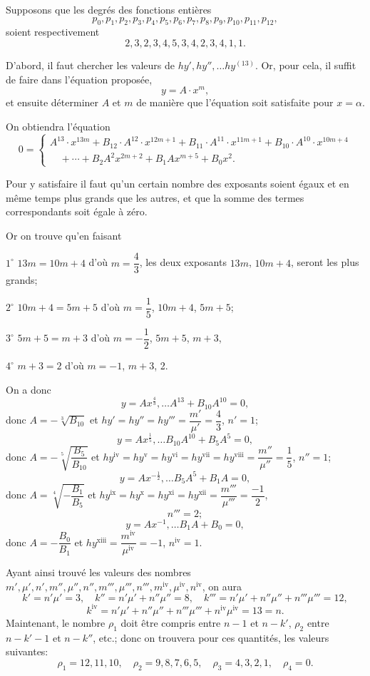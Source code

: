 \documentclass{article}
\begin{document}
Supposons que les degrés des fonctions entières
\[ p_0, p_1, p_2, p_3, p_4, p_5, p_6, p_7, p_8, p_9, p_{10}, p_{11}, p_{12}, \]
soient respectivement
\[ 2, 3, 2, 3, 4, 5, 3, 4, 2, 3, 4, 1, 1. \]

D'abord, il faut chercher les valeurs de $hy', hy'', \ldots hy^{(13)}$. Or, pour cela, il suffit de faire dans l'équation proposée,
\[ y = A \cdot x^{m}, \]
et ensuite déterminer $A$ et $m$ de manière que l'équation soit satisfaite pour $x = \alpha$.

On obtiendra l'équation
\[ 0 = \begin{cases} A^{13} \cdot x^{13m} + B_{12} \cdot A^{12} \cdot x^{12m+1} + B_{11} \cdot A^{11} \cdot x^{11m+1} + B_{10} \cdot A^{10} \cdot x^{10m+4} \\ \quad + \cdots + B_2 A^{2} x^{2m+2} + B_1 A x^{m+5} + B_0 x^{2}. \end{cases} \]

Pour y satisfaire il faut qu'un certain nombre des exposants
soient égaux et en même temps plus grands que les autres, et que la somme des termes correspondants soit égale à zéro.

Or on trouve qu'en faisant

$1^\circ$ $13m = 10m+4$ d'où $m = \dfrac{4}{3}$, les deux exposants $13m$, $10m+4$, seront les plus grands;

$2^\circ$ $10m+4 = 5m+5$ d'où $m = \dfrac{1}{5}$, $10m+4$, $5m+5$;

$3^\circ$ $5m+5 = m+3$ d'où $m = -\dfrac{1}{2}$, $5m+5$, $m+3$,

$4^\circ$ $m+3 = 2$ d'où $m = -1$, $m+3$, 2.

On a donc
\[ y = A x^{\frac{4}{3}}, \ldots A^{13} + B_{10}A^{10} = 0, \]
donc $A = -\sqrt[3]{B_{10}}$ et $hy' = hy'' = hy''' = \dfrac{m'}{\mu'} = \dfrac{4}{3}$, $n' = 1$;
\[ y = A x^{\frac{1}{5}}, \ldots B_{10}A^{10} + B_5 A^{5} = 0, \]
donc $A = -\sqrt[5]{\dfrac{B_5}{B_{10}}}$ et $hy^{\text{iv}} = hy^{\text{v}} = hy^{\text{vi}} = hy^{\text{vii}} = hy^{\text{viii}} = \dfrac{m''}{\mu''} = \dfrac{1}{5}$, $n'' = 1$;
\[ y = A x^{-\frac{1}{2}}, \ldots B_5 A^{5} + B_1 A = 0, \]
donc $A = \sqrt[4]{-\dfrac{B_1}{B_5}}$ et $hy^{\text{ix}} = hy^{\text{x}} = hy^{\text{xi}} = hy^{\text{xii}} = \dfrac{m'''}{\mu'''} = \dfrac{-1}{2}$,
\[ n''' = 2; \]
\[ y = A x^{-1}, \ldots B_1 A + B_0 = 0, \]
donc $A = -\dfrac{B_0}{B_1}$ et $hy^{\text{xiii}} = \dfrac{m^{\text{iv}}}{\mu^{\text{iv}}} = -1$, $n^{\text{iv}} = 1$.

Ayant ainsi trouvé les valeurs des nombres $m', \mu', n', m'', \mu'', n'', m''', \mu''', n''', m^{\text{iv}}, \mu^{\text{iv}}, n^{\text{iv}}$, on aura
\[ k' = n'\mu' = 3, \quad k'' = n'\mu'+n''\mu'' = 8, \quad k''' = n'\mu'+n''\mu''+n'''\mu''' = 12, \]
\[ k^{\text{iv}} = n'\mu'+n''\mu''+n'''\mu'''+n^{\text{iv}}\mu^{\text{iv}} = 13 = n. \]
Maintenant, le nombre $\rho_1$ doit être compris entre $n-1$ et $n-k'$, $\rho_2$ entre $n-k'-1$ et $n-k''$, etc.; donc on trouvera pour ces quantités, les valeurs suivantes:
\[ \rho_1 = 12, 11, 10, \quad \rho_2 = 9, 8, 7, 6, 5, \quad \rho_3 = 4, 3, 2, 1, \quad \rho_4 = 0. \]
\end{document}
